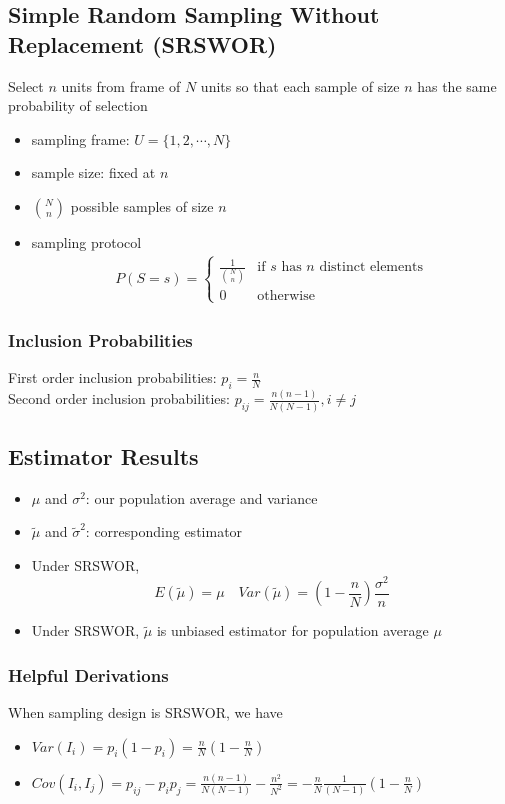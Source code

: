 \documentclass[11pt]{article}
\begin{document}
\subsection{Simple Random Sampling Without Replacement (SRSWOR)}
Select $n$ units from frame of $N$ units so that each sample of size $n$
has the same probability of selection 
\begin{itemize}
    \item sampling frame: $U=\{1,2,\cdots,N\}$
    \item sample size: fixed at $n$
    \item $N\choose n$ possible samples of size $n$
    \item sampling protocol 
    \begin{align*}
        P(S=s)=
        \begin{cases}
            \frac{1}{{N\choose n}} &\text{if $s$ has $n$ distinct elements} \\
            0 &\text{otherwise}
        \end{cases}
    \end{align*}
\end{itemize}
\subsubsection*{Inclusion Probabilities}
First order inclusion probabilities: $p_i=\frac{n}{N}$ \\
Second order inclusion probabilities: $p_{ij}=\frac{n(n-1)}{N(N-1)}, i\neq j$
\subsection{Estimator Results}
\begin{itemize}
    \item $\mu$ and $\sigma^2$: our population average and variance 
    \item $\tilde{\mu}$ and $\tilde{\sigma}^2$: corresponding estimator 
    \item Under SRSWOR, \[E(\tilde{\mu})=\mu\quad Var(\tilde{\mu})=(1-\frac{n}{N})\frac{\sigma^2}{n}\]
    \item Under SRSWOR, $\tilde{\mu}$ is unbiased estimator for population average $\mu$
\end{itemize}
\subsubsection*{Helpful Derivations}
When sampling design is SRSWOR, we have 
\begin{itemize}
    \item $Var(I_i)=p_i(1-p_i)=\frac{n}{N}(1-\frac{n}{N})$
    \item $Cov(I_i,I_j)=p_{ij}-p_ip_j=\frac{n(n-1)}{N(N-1)}-\frac{n^2}{N^2}=-\frac{n}{N}\frac{1}{(N-1)}(1-\frac{n}{N})$
\end{itemize}
\end{document}
